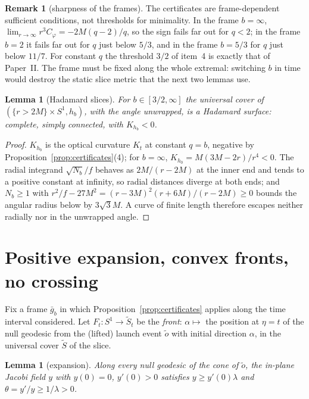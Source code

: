 \documentclass[aip,jmp,amsmath,amssymb,reprint]{revtex4-2}
\theoremstyle{plain}
\newtheorem{lemma}[proposition]{Lemma}
\theoremstyle{definition}
\newtheorem{remark}[proposition]{Remark}
\begin{document}
\begin{remark}[sharpness of the frames]\label{rmk:frames-sharp}
The certificates are frame-dependent sufficient conditions, not thresholds for
minimality. In the frame $b=\infty$, $\lim_{r\to\infty}r^3C_\varphi=-2M(q-2)/q$, so the sign
fails far out for $q<2$; in the frame $b=2$ it fails far out for $q$ just below $5/3$, and
in the frame $b=5/3$ for $q$ just below $11/7$. For constant $q$ the threshold $3/2$ of
item~4 is exactly that of Paper~II. The frame must be fixed along the whole extremal:
switching $b$ in time would destroy the static slice metric that the next two lemmas use.
\end{remark}

\begin{lemma}[Hadamard slices]\label{lem:hadamard}
For $b\in[3/2,\infty]$ the universal cover of $(\{r>2M\}\times S^1,h_b)$, with the angle
unwrapped, is a Hadamard surface: complete, simply connected, with $K_{h_b}<0$.
\end{lemma}

\begin{proof}
$K_{h_b}$ is the optical curvature $K_t$ at constant $q=b$, negative by
Proposition~\ref{prop:certificates}(4); for $b=\infty$,
$K_{h_0}=M(3M-2r)/r^4<0$. The radial integrand $\sqrt{N_b}/f$ behaves as $2M/(r-2M)$ at the
inner end and tends to a positive constant at infinity, so radial distances diverge at
both ends; and $N_b\ge1$ with $r^2/f-27M^2=(r-3M)^2(r+6M)/(r-2M)\ge0$ bounds the angular
radius below by $3\sqrt3M$. A curve of finite length therefore escapes neither radially
nor in the unwrapped angle.
\end{proof}

\section{Positive expansion, convex fronts, no crossing}
\label{sec:fronts}
Fix a frame $\bar g_b$ in which Proposition~\ref{prop:certificates} applies along the
time interval considered. Let $F_t:S^1\to\tilde S_t$ be the \emph{front}: $\alpha\mapsto$
the position at $\eta=t$ of the null geodesic from the (lifted) launch event $\tilde o$
with initial direction $\alpha$, in the universal cover $\tilde S$ of the slice.

\begin{lemma}[expansion]\label{lem:expansion}
Along every null geodesic of the cone of $\tilde o$, the in-plane Jacobi field $y$ with
$y(0)=0$, $y'(0)>0$ satisfies $y\ge y'(0)\lambda$ and $\theta=y'/y\ge1/\lambda>0$.
\end{lemma}
\end{document}
